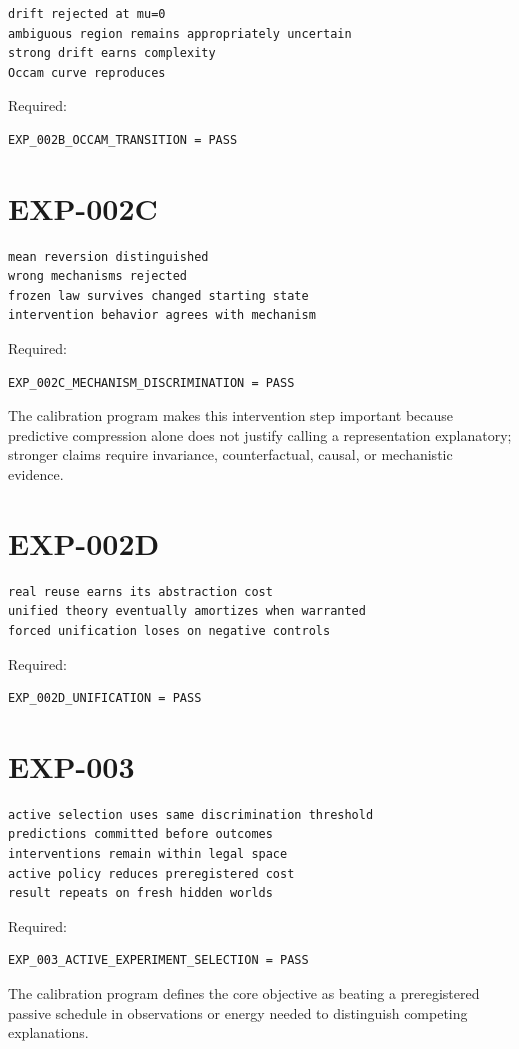\documentclass[11pt]{article}
\begin{document}
\begin{verbatim}
drift rejected at mu=0
ambiguous region remains appropriately uncertain
strong drift earns complexity
Occam curve reproduces
\end{verbatim}
Required:
\begin{verbatim}
EXP_002B_OCCAM_TRANSITION = PASS
\end{verbatim}

\section{EXP-002C}

\begin{verbatim}
mean reversion distinguished
wrong mechanisms rejected
frozen law survives changed starting state
intervention behavior agrees with mechanism
\end{verbatim}
Required:
\begin{verbatim}
EXP_002C_MECHANISM_DISCRIMINATION = PASS
\end{verbatim}
The calibration program makes this intervention step important because predictive compression alone does not justify calling a representation explanatory; stronger claims require invariance, counterfactual, causal, or mechanistic evidence.

\section{EXP-002D}

\begin{verbatim}
real reuse earns its abstraction cost
unified theory eventually amortizes when warranted
forced unification loses on negative controls
\end{verbatim}
Required:
\begin{verbatim}
EXP_002D_UNIFICATION = PASS
\end{verbatim}

\section{EXP-003}

\begin{verbatim}
active selection uses same discrimination threshold
predictions committed before outcomes
interventions remain within legal space
active policy reduces preregistered cost
result repeats on fresh hidden worlds
\end{verbatim}
Required:
\begin{verbatim}
EXP_003_ACTIVE_EXPERIMENT_SELECTION = PASS
\end{verbatim}
The calibration program defines the core objective as beating a preregistered passive schedule in observations or energy needed to distinguish competing explanations.
\end{document}
